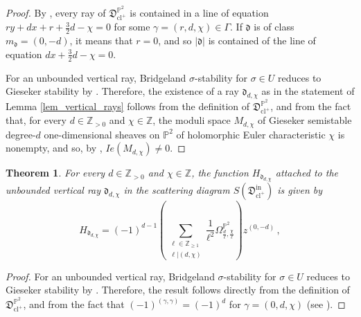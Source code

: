 \documentclass[11pt,letterpaper]{amsart}
\newtheorem{thm}[defn]{Theorem}
\newcommand\PP{\mathbb P}
\newcommand\Z{\mathbb Z}
\newcommand\fd{\mathfrak d}
\newcommand\fD{\mathfrak D}
\newcommand\cl{\operatorname{cl}}
\newcommand\ev{\operatorname{ev}}
\newcommand\iin{\mathrm{in}}
\begin{document}
\begin{proof}
By \cite[Definition 2.5.8]{bousseau2019scattering}, every ray of $\fD^{\PP^2}_{\cl^+}$
is contained in a line of equation $ry+dx+r+\frac{3}{2}d-\chi=0$
for some $\gamma =(r,d,\chi)\in \Gamma$. If $\fd$ is of class 
$m_\fd=(0,-d)$, it means that $r=0$, and so 
$|\fd|$ is contained of the line of equation $dx+\frac{3}{2}d-\chi=0$.

For an unbounded vertical ray, Bridgeland $\sigma$-stability 
for $\sigma \in U$ reduces to Gieseker stability by 
\cite[Lemma 5.1.1]{bousseau2019scattering}.
Therefore, the existence of a ray 
$\fd_{d,\chi}$ as in the statement of 
Lemma \ref{lem_vertical_rays} follows from
the definition 
\cite[Definition 2.5.8]{bousseau2019scattering} of $\fD^{\PP^2}_{\cl^+}$, and from
the fact that, for every $d \in \Z_{>0}$ and 
$\chi \in \Z$, the moduli space 
$M_{d,\chi}$ of Gieseker semistable 
degree-$d$ one-dimensional sheaves on $\PP^2$ of holomorphic Euler characteristic $\chi$ is nonempty, 
and so, by \cite[Corollary 6.1.3]{bousseau2019scattering}, $Ie(M_{d,\chi})
\neq 0$.
\end{proof}



\begin{thm}\label{thm_boussseau}
For every $d \in \Z_{>0}$ and $\chi \in \Z$, the function 
$H_{\fd_{d,\chi}}$ attached to the unbounded vertical ray 
$\fd_{d,\chi}$ in the scattering diagram $S(\fD^\iin_{\cl^+})$ is given by
\[ H_{\fd_{d,\chi}}=
(-1)^{d-1}
\left( \sum_{\substack{\ell \in \Z_{\geqslant 1} \\\ell|(d,\chi)}}
\frac{1}{\ell^2} \Omega_{\frac{d}{\ell},\frac{\chi}{\ell}}^{\PP^2}
\right) z^{(0,-d)} \,, \]
\end{thm}

\begin{proof}
For an unbounded vertical ray, Bridgeland $\sigma$-stability 
for $\sigma \in U$ reduces to Gieseker stability by 
\cite[Lemma 6.1.1]{bousseau2019scattering}.
Therefore, the result follows directly from
the definition 
\cite[Definition 2.5.8]{bousseau2019scattering} of $\fD^{\PP^2}_{\cl^+}$, 
and from the fact that $(-1)^{(\gamma,\gamma)}=(-1)^{d}$ for 
$\gamma=(0,d,\chi)$ (see \cite[Definition 2.1.1]{bousseau2019scattering}).

\end{proof}
\end{document}
